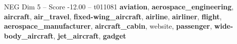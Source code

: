 \begin{textsample}{NEG Dim 5 – Score -12.00 – t011081}  \label{ex:f5_neg_029}
\textbf{aviation}, \textbf{aerospace\_engineering}, \textbf{aircraft}, \textbf{air\_travel}, \textbf{fixed-wing\_aircraft}, \textbf{airline}, \textbf{airliner}, \textbf{flight}, \textbf{aerospace\_manufacturer}, \textbf{aircraft\_cabin}, website, \textbf{passenger}, \textbf{wide-body\_aircraft}, \textbf{jet\_aircraft}, \textbf{gadget}

\end{textsample}
